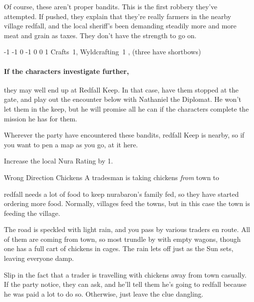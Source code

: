 \begin{multicols}{2}
Of course, these aren't proper bandits.
This is the first robbery they've attempted.
If pushed, they explain that they're really farmers in the nearby village \gls{redfall}, and the local sheriff's been demanding steadily more and more meat and grain as taxes.
They don't have the strength to go on.


  {-1}%
  {-1}%
  {{0}%
  {-1}%
  {0}}%
  {0}%
  {1}%
  {Crafts~1, Wyldcrafting~1}%
  {\Dagger, (three have shortbows)}%
  {}

\paragraph{If the characters investigate further,}
they may well end up at Redfall Keep.
In that case, have them stopped at the gate, and play out the encounter below with Nathaniel the Diplomat.
He won't let them in the keep, but he will promise all he can if the characters complete the mission he has for them.

Wherever the party have encountered these bandits, \gls{redfall} Keep is nearby, so if you want to pen a map as you go, at it here.

Increase the local Nura Rating by 1.

{\N Wrong Direction Chickens}%
{A tradesman is taking chickens \emph{from} town to }%

\Gls{redfall} needs a lot of food to keep \gls{nurabaron}'s family fed, so they have started ordering more food.
Normally, villages feed the towns, but in this case the town is feeding the village.

\begin{boxtext}

  The road is speckled with light rain, and you pass by various traders en route.
  All of them are coming from town, so most trundle by with empty wagons, though one has a full cart of chickens in cages.
  The rain lets off just as the Sun sets, leaving everyone damp.

\end{boxtext}

Slip in the fact that a trader is travelling with chickens away from \gls{town} casually.
If the party notice, they can ask, and he'll tell them he's going to \gls{redfall} because he was paid a lot to do so.
Otherwise, just leave the clue dangling.


\end{multicols}
